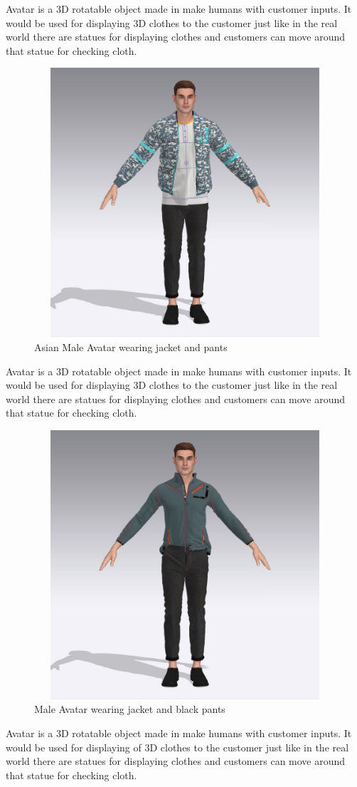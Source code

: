 Avatar is a 3D rotatable object made in make humans with customer inputs. It would be used for displaying 3D clothes to the customer just like in the real world there are statues for displaying clothes and customers can move around that statue for checking cloth.  
\begin{figure}[H]
    \centering
    \includegraphics[width=13cm,height=10cm]{Figures/3DAvatars/male3.jpeg}
    \caption{Asian Male Avatar wearing jacket and pants}
    \label{Male Avatar wearing jacket and pants}
    
\end{figure}
Avatar is a 3D rotatable object made in make humans with customer inputs. It would be used for displaying 3D clothes to the customer just like in the real world there are statues for displaying clothes and customers can move around that statue for checking cloth.  
\begin{figure}[H]
    \centering
    \includegraphics[width=13cm,height=10cm]{Figures/3DAvatars/male4.jpeg}
    \caption{Male Avatar wearing jacket and black pants}
    \label{Male Avatar wearing jacket and black pants}

\end{figure}
\justifying
	Avatar is a 3D rotatable object made in make humans with customer inputs. It would be used for displaying of 3D clothes to the customer just like in the real world there are statues for displaying clothes and customers can move around that statue for checking cloth.  
